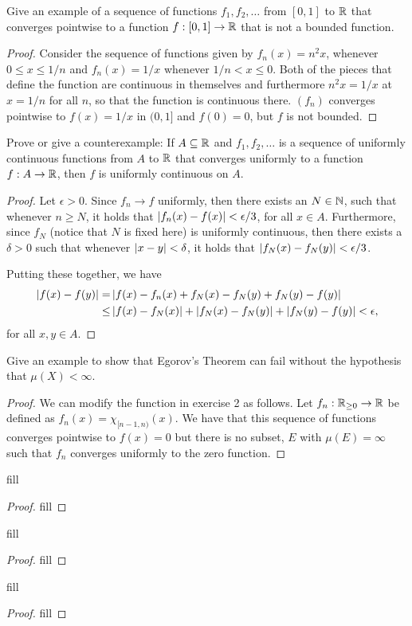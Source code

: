 \begin{exercise}{3}
Give an example of a sequence of functions $f_1, f_2, \dots$ from $[0,1]$ to $\mathbb{R}$ that converges pointwise to a function $f:[0,1] \to \mathbb{R}$ that is not a bounded function.
\end{exercise}
\begin{proof}
Consider the sequence of functions given by $f_n(x) = n^2 x$, whenever $0 \leq x \leq 1/n$ and $f_n(x) = 1/x$ whenever $1/n < x \leq 0$.
Both of the pieces that define the function are continuous in themselves and furthermore $n^2 x= 1/x$ at $x=1/n$ for all $n$, so that the function is continuous there. 
$(f_n)$ converges pointwise to $f(x) = 1/x$ in $(0,1]$ and $f(0) = 0$, but $f$ is not bounded.
\end{proof} 

\begin{exercise}{4}
Prove or give a counterexample:
If $A \subseteq \mathbb{R}$ and $f_1,f_2,\dots$ is a sequence of uniformly continuous functions from $A$ to $\mathbb{R}$ that converges uniformly to a function $f: A \to \mathbb{R}$, then $f$ is uniformly continuous on $A$.
\end{exercise}
\begin{proof}
Let $\epsilon > 0$.
Since $f_n \to f$ uniformly, then there exists an $N \in \mathbb{N}$, such that whenever $n \geq N$, it holds that $\left\lvert f_n(x) - f(x)\right\rvert < \epsilon/3$, for all $x \in A$.
Furthermore, since $f_N$ (notice that $N$ is fixed here) is uniformly continuous, then there exists a $\delta > 0$ such that whenever $\left\lvert x - y\right\rvert < \delta$, it holds that $\left\lvert f_N(x) - f_N(y)\right\rvert < \epsilon/3$.

Putting these together, we have
\begin{align*}
    \left\lvert f(x) - f(y)\right\rvert
    =& \left\lvert f(x) - f_n(x) + f_N(x) - f_N(y) + f_N(y) -f(y)\right\rvert\\
    \leq& \left\lvert f(x) - f_N(x)\right\rvert 
    + \left\lvert f_N(x) - f_N(y)\right\rvert
    + \left\lvert f_N(y) -f(y)\right\rvert < \epsilon,
\end{align*}
for all $x,y \in A$.
\end{proof} 

\begin{exercise}{5}
Give an example to show that Egorov's Theorem can fail without the hypothesis that $\mu(X) < \infty$.
\end{exercise}
\begin{proof}
We can modify the function in exercise 2 as follows.
Let $f_n : \mathbb{R}_{\geq 0} \to \mathbb{R}$ be defined as $f_n(x) = \chi_{[n-1,n)}(x)$.
We have that this sequence of functions converges pointwise to $f(x) = 0$ but there is no subset, $E$ with $\mu(E) = \infty$ such that $f_n$ converges uniformly to the zero function.
\end{proof} 

\begin{exercise}{7}
fill
\end{exercise}
\begin{proof}
fill
\end{proof} 

\begin{exercise}{13}
fill
\end{exercise}
\begin{proof}
fill
\end{proof} 

\begin{exercise}{15}
fill
\end{exercise}
\begin{proof}
fill
\end{proof} 

